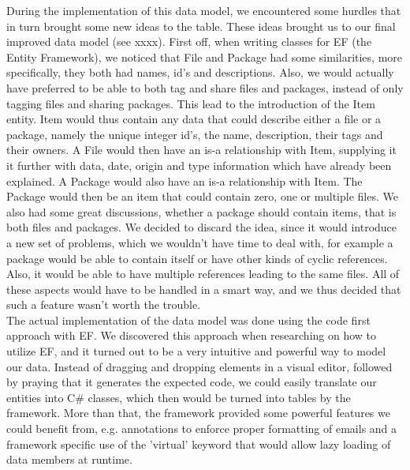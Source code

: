 \documentclass[10pt,a4paper]{article}
\begin{document}
During the implementation of this data model, we encountered some hurdles that in turn brought some new ideas to the table. These ideas brought us to our final improved  data model (see xxxx). First off, when writing classes for EF (the Entity Framework), we noticed that File and Package had some similarities, more specifically, they both had names, id's and descriptions. Also, we would actually have preferred to be able to both tag and share files and packages, instead of only tagging files and sharing packages. This lead to the introduction of the Item entity. Item would thus contain any data that could describe either a file or a package, namely the unique integer id's, the name, description, their tags and their owners. A File would then have an is-a relationship with Item, supplying it it further with data, date, origin and type information which have already been explained. A Package would also have an is-a relationship with Item. The Package would then be an item that could contain zero, one or multiple files. We also had some great discussions, whether a package should contain items, that is both files and packages. We decided to discard the idea, since it would introduce a new set of problems, which we wouldn't have time to deal with, for example a package would be able to contain itself or have other kinds of cyclic references. Also, it would be able to have multiple references leading to the same files. All of these aspects would have to be handled in a smart way, and we thus decided that such a feature wasn’t worth the trouble.\\
The actual implementation of the data model was done using the code first approach with EF. We discovered this approach when researching on how to utilize EF, and it turned out to be a very intuitive and powerful way to model our data. Instead of dragging and dropping elements in a visual editor, followed by praying that it generates the expected code, we could easily translate our entities into C\# classes, which then would be turned into tables by the framework. More than that, the framework provided some powerful features we could benefit  from, e.g. annotations to enforce proper formatting of emails and a framework specific use of the 'virtual' keyword that would allow lazy loading of data members at runtime.
\end{document}
